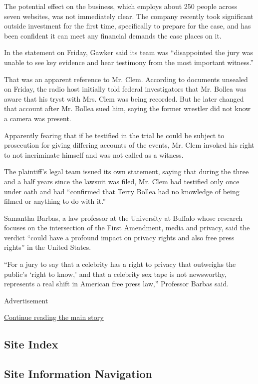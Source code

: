 The potential effect on the business, which employs about 250 people
across seven websites, was not immediately clear. The company recently
took significant outside investment for the first time, specifically to
prepare for the case, and has been confident it can meet any financial
demands the case places on it.

In the statement on Friday, Gawker said its team was ``disappointed the
jury was unable to see key evidence and hear testimony from the most
important witness.''

That was an apparent reference to Mr. Clem. According to documents
unsealed on Friday, the radio host initially told federal investigators
that Mr. Bollea was aware that his tryst with Mrs. Clem was being
recorded. But he later changed that account after Mr. Bollea sued him,
saying the former wrestler did not know a camera was present.

Apparently fearing that if he testified in the trial he could be subject
to prosecution for giving differing accounts of the events, Mr. Clem
invoked his right to not incriminate himself and was not called as a
witness.

The plaintiff's legal team issued its own statement, saying that during
the three and a half years since the lawsuit was filed, Mr. Clem had
testified only once under oath and had ``confirmed that Terry Bollea had
no knowledge of being filmed or anything to do with it.''

Samantha Barbas, a law professor at the University at Buffalo whose
research focuses on the intersection of the First Amendment, media and
privacy, said the verdict ``could have a profound impact on privacy
rights and also free press rights'' in the United States.

``For a jury to say that a celebrity has a right to privacy that
outweighs the public's `right to know,' and that a celebrity sex tape is
not newsworthy, represents a real shift in American free press law,''
Professor Barbas said.

Advertisement

\protect\hyperlink{after-bottom}{Continue reading the main story}

\hypertarget{site-index}{%
\subsection{Site Index}\label{site-index}}

\hypertarget{site-information-navigation}{%
\subsection{Site Information
Navigation}\label{site-information-navigation}}

